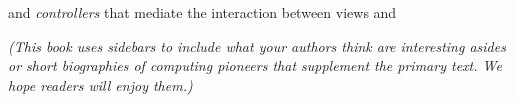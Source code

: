 and \emph{controllers} that mediate the interaction between views and

\emph{(This book uses sidebars to include what your authors think are
  interesting asides or short biographies of computing pioneers that
  supplement the primary text.  We hope readers will enjoy them.)}